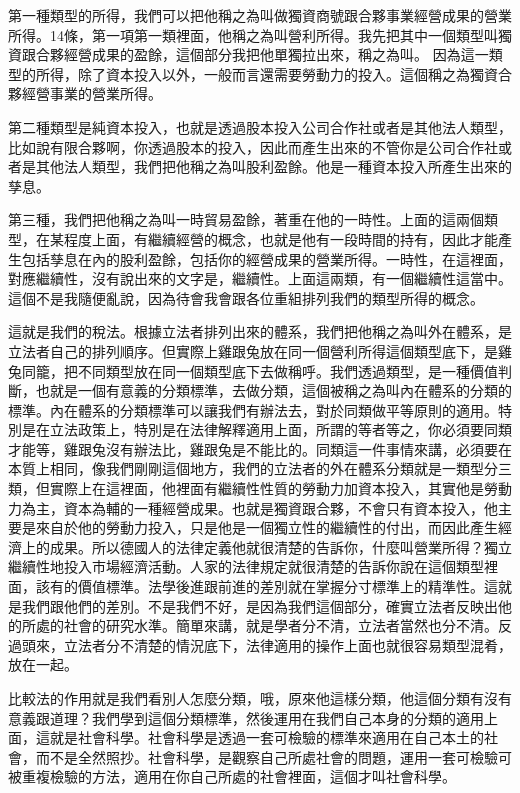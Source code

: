 \documentclass[]{ctexbook}
\begin{document}
第一種類型的所得，我們可以把他稱之為叫做獨資商號跟合夥事業經營成果的營業所得。14條，第一項第一類裡面，他稱之為叫營利所得。我先把其中一個類型叫獨資跟合夥經營成果的盈餘，這個部分我把他單獨拉出來，稱之為叫。
因為這一類型的所得，除了資本投入以外，一般而言還需要勞動力的投入。這個稱之為獨資合夥經營事業的營業所得。

第二種類型是純資本投入，也就是透過股本投入公司合作社或者是其他法人類型，比如說有限合夥啊，你透過股本的投入，因此而產生出來的不管你是公司合作社或者是其他法人類型，我們把他稱之為叫股利盈餘。他是一種資本投入所產生出來的孳息。

第三種，我們把他稱之為叫一時貿易盈餘，著重在他的一時性。上面的這兩個類型，在某程度上面，有繼續經營的概念，也就是他有一段時間的持有，因此才能產生包括孳息在內的股利盈餘，包括你的經營成果的營業所得。一時性，在這裡面，對應繼續性，沒有說出來的文字是，繼續性。上面這兩類，有一個繼續性這當中。這個不是我隨便亂說，因為待會我會跟各位重組排列我們的類型所得的概念。

這就是我們的稅法。根據立法者排列出來的體系，我們把他稱之為叫外在體系，是立法者自己的排列順序。但實際上雞跟兔放在同一個營利所得這個類型底下，是雞兔同籠，把不同類型放在同一個類型底下去做稱呼。我們透過類型，是一種價值判斷，也就是一個有意義的分類標準，去做分類，這個被稱之為叫內在體系的分類的標準。內在體系的分類標準可以讓我們有辦法去，對於同類做平等原則的適用。特別是在立法政策上，特別是在法律解釋適用上面，所謂的等者等之，你必須要同類才能等，雞跟兔沒有辦法比，雞跟兔是不能比的。同類這一件事情來講，必須要在本質上相同，像我們剛剛這個地方，我們的立法者的外在體系分類就是一類型分三類，但實際上在這裡面，他裡面有繼續性性質的勞動力加資本投入，其實他是勞動力為主，資本為輔的一種經營成果。也就是獨資跟合夥，不會只有資本投入，他主要是來自於他的勞動力投入，只是他是一個獨立性的繼續性的付出，而因此產生經濟上的成果。所以德國人的法律定義他就很清楚的告訴你，什麼叫營業所得？獨立繼續性地投入市場經濟活動。人家的法律規定就很清楚的告訴你說在這個類型裡面，該有的價值標準。法學後進跟前進的差別就在掌握分寸標準上的精準性。這就是我們跟他們的差別。不是我們不好，是因為我們這個部分，確實立法者反映出他的所處的社會的研究水準。簡單來講，就是學者分不清，立法者當然也分不清。反過頭來，立法者分不清楚的情況底下，法律適用的操作上面也就很容易類型混肴，放在一起。

比較法的作用就是我們看別人怎麼分類，哦，原來他這樣分類，他這個分類有沒有意義跟道理？我們學到這個分類標準，然後運用在我們自己本身的分類的適用上面，這就是社會科學。社會科學是透過一套可檢驗的標準來適用在自己本土的社會，而不是全然照抄。社會科學，是觀察自己所處社會的問題，運用一套可檢驗可被重複檢驗的方法，適用在你自己所處的社會裡面，這個才叫社會科學。
\end{document}
